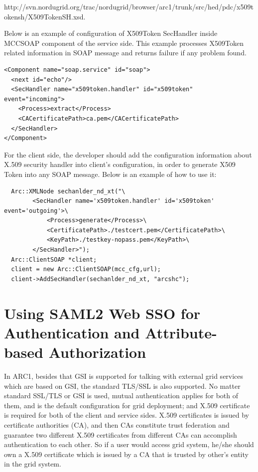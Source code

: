 \documentclass{article}                            %
\begin{document}
http://svn.nordugrid.org/trac/nordugrid/browser/arc1/trunk/src/hed/pdc/x509tokensh/X509TokenSH.xsd.

Below is an example of configuration of X509Token SecHandler inside MCCSOAP component of the service side. This example processes X509Token related information in SOAP message and returns failure if any problem found.

\begin{verbatim}
<Component name="soap.service" id="soap">
  <next id="echo"/>
  <SecHandler name="x509token.handler" id="x509token" event="incoming">
    <Process>extract</Process>
    <CACertificatePath>ca.pem</CACertificatePath>
  </SecHandler>
</Component>
\end{verbatim}

For the client side, the developer should add the configuration information about X.509 security handler into client's configuration, in order to generate X509 Token into any SOAP message. Below is an example of how to use it:

\begin{verbatim}
  Arc::XMLNode sechanlder_nd_xt("\ 
        <SecHandler name='x509token.handler' id='x509token' event='outgoing'>\ 
            <Process>generate</Process>\ 
            <CertificatePath>./testcert.pem</CertificatePath>\ 
            <KeyPath>./testkey-nopass.pem</KeyPath>\ 
        </SecHandler>"); 
  Arc::ClientSOAP *client; 
  client = new Arc::ClientSOAP(mcc_cfg,url); 
  client->AddSecHandler(sechanlder_nd_xt, "arcshc");
\end{verbatim}




\section{Using SAML2 Web SSO for Authentication and Attribute-based Authorization} %
\label{sec:samlsso}
   In ARC1, besides that GSI is supported for talking with external grid services which are based on GSI, the standard TLS/SSL is also supported. No matter standard SSL/TLS or GSI is used, mutual authentication applies for both of them, and is the default configuration for grid deployment; and X.509 certificate is required for both of the client and service sides. X.509 certificates is issued by certificate authorities (CA), and then CAs constitute trust federation and guarantee two different X.509 certificates from different CAs can accomplish authentication to each other. So if a user would access grid system, he/she should own a X.509 certificate which is issued by a CA that is trusted by other's entity in the grid system.
\end{document}
